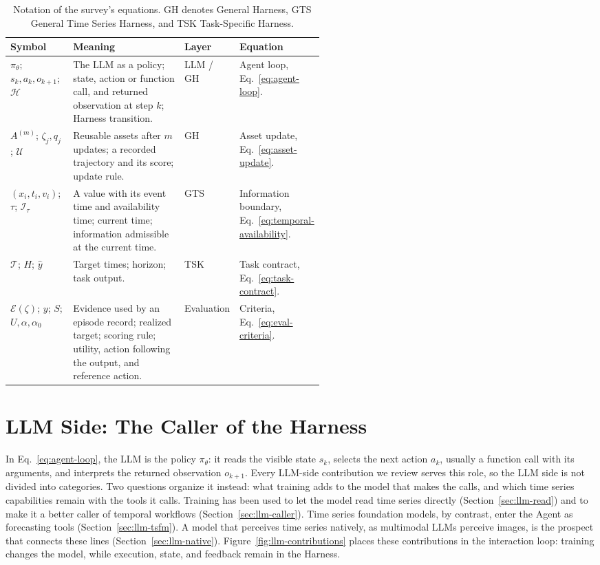 \documentclass[preprints,article,submit,moreauthors]{Definitions/mdpi}
\begin{document}
\begin{table}[t]
\centering\small
\setlength{\tabcolsep}{4pt}
\renewcommand{\arraystretch}{1.12}
\begin{tabularx}{\linewidth}{@{}p{0.2\linewidth}Xp{0.13\linewidth}p{0.2\linewidth}@{}}
\toprule
\textbf{Symbol} & \textbf{Meaning} & \textbf{Layer} & \textbf{Equation}\\
\midrule
$\pi_\theta$; $s_k,a_k,o_{k+1}$; $\mathcal{H}$ & The LLM as a policy; state, action or function call, and returned observation at step $k$; Harness transition. & LLM / GH & Agent loop, Eq.~\eqref{eq:agent-loop}.\\
$A^{(m)}$; $\zeta_j,q_j$; $\mathcal{U}$ & Reusable assets after $m$ updates; a recorded trajectory and its score; update rule. & GH & Asset update, Eq.~\eqref{eq:asset-update}.\\
$(x_i,t_i,v_i)$; $\tau$; $\mathcal{I}_{\tau}$ & A value with its event time and availability time; current time; information admissible at the current time. & GTS & Information boundary, Eq.~\eqref{eq:temporal-availability}.\\
$\mathcal{T}$; $H$; $\widehat{y}$ & Target times; horizon; task output. & TSK & Task contract, Eq.~\eqref{eq:task-contract}.\\
$\mathcal{E}(\zeta)$; $y$; $S$; $U,\alpha,\alpha_0$ & Evidence used by an episode record; realized target; scoring rule; utility, action following the output, and reference action. & Evaluation & Criteria, Eq.~\eqref{eq:eval-criteria}.\\
\bottomrule
\end{tabularx}
\caption{Notation of the survey's equations. GH denotes General Harness, GTS General Time Series Harness, and TSK Task-Specific Harness.}
\label{tab:unified-notation}
\end{table}
\section{LLM Side: The Caller of the Harness}
\label{sec:llm-side}

In Eq.~\eqref{eq:agent-loop}, the LLM is the policy $\pi_\theta$: it reads the visible state $s_k$, selects the next action $a_k$, usually a function call with its arguments, and interprets the returned observation $o_{k+1}$. Every LLM-side contribution we review serves this role, so the LLM side is not divided into categories. Two questions organize it instead: what training adds to the model that makes the calls, and which time series capabilities remain with the tools it calls. Training has been used to let the model read time series directly (Section~\ref{sec:llm-read}) and to make it a better caller of temporal workflows (Section~\ref{sec:llm-caller}). Time series foundation models, by contrast, enter the Agent as forecasting tools (Section~\ref{sec:llm-tsfm}). A model that perceives time series natively, as multimodal LLMs perceive images, is the prospect that connects these lines (Section~\ref{sec:llm-native}). Figure~\ref{fig:llm-contributions} places these contributions in the interaction loop: training changes the model, while execution, state, and feedback remain in the Harness.
\end{document}

